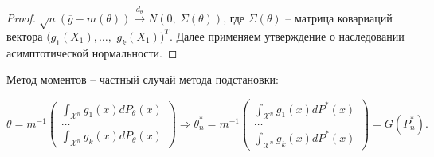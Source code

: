 \begin{proof}
    $\displaystyle \sqrt{n}(\overline{g} -m( \theta ))\xrightarrow{d_{\theta }} N( 0,\ \Sigma ( \theta ))$, где $\displaystyle \Sigma ( \theta )$ -- матрица ковариаций вектора $\displaystyle ( g_{1}( X_{1}) ,\dotsc ,$ $g_{k}( X_{1}))^{T}$. Далее применяем утверждение о наследовании асимптотической нормальности.
\end{proof}
\begin{note}
Метод моментов -- частный случай метода подстановки:


\begin{equation*}
\theta =m^{-1}\begin{pmatrix}
\int _{\mathcal{X}^{n}} g_{1}( x) dP_{\theta }( x)\\
\dotsc \\
\int _{\mathcal{X}^{n}} g_{k}( x) dP_{\theta }( x)
\end{pmatrix} \Rightarrow \theta _{n}^{*} =m^{-1}\begin{pmatrix}
\int _{\mathcal{X}^{n}} g_{1}( x) dP^{*}( x)\\
\dotsc \\
\int _{\mathcal{X}^{n}} g_{k}( x) dP^{*}( x)
\end{pmatrix} =G\left( P_{n}^{*}\right) .
\end{equation*}
\end{note}

